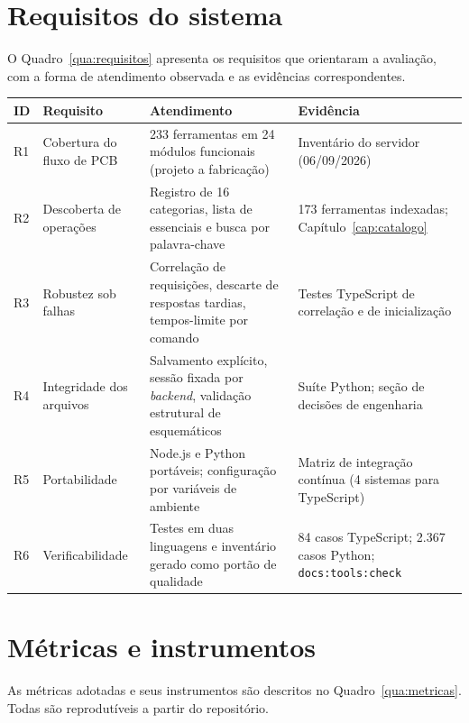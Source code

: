 \section{Requisitos do sistema}\label{sec:req-monografia}

O Quadro~\ref{qua:requisitos} apresenta os requisitos que orientaram a
avaliação, com a forma de atendimento observada e as evidências
correspondentes.

\begin{quadro}[htbp]
\centering
\small
\caption{Requisitos, atendimento e evidências.}
\label{qua:requisitos}
\begin{tabular}{@{}p{0.7cm}p{3.4cm}p{5.2cm}p{4.6cm}@{}}
\toprule
\textbf{ID} & \textbf{Requisito} & \textbf{Atendimento} & \textbf{Evidência} \\
\midrule
R1 & Cobertura do fluxo de PCB & 233 ferramentas em 24 módulos funcionais (projeto a fabricação) & Inventário do servidor (06/09/2026) \\
R2 & Descoberta de operações & Registro de 16 categorias, lista de essenciais e busca por palavra-chave & 173 ferramentas indexadas; Capítulo~\ref{cap:catalogo} \\
R3 & Robustez sob falhas & Correlação de requisições, descarte de respostas tardias, tempos-limite por comando & Testes TypeScript de correlação e de inicialização \\
R4 & Integridade dos arquivos & Salvamento explícito, sessão fixada por \emph{backend}, validação estrutural de esquemáticos & Suíte Python; seção de decisões de engenharia \\
R5 & Portabilidade & Node.js e Python portáveis; configuração por variáveis de ambiente & Matriz de integração contínua (4 sistemas para TypeScript) \\
R6 & Verificabilidade & Testes em duas linguagens e inventário gerado como portão de qualidade & 84 casos TypeScript; 2.367 casos Python; \texttt{docs:tools:check} \\
\bottomrule
\end{tabular}
\end{quadro}

\section{Métricas e instrumentos}

As métricas adotadas e seus instrumentos são descritos no
Quadro~\ref{qua:metricas}. Todas são reprodutíveis a partir do repositório.

